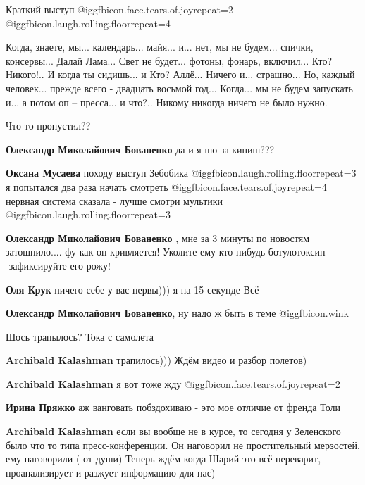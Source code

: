 \begin{itemize}
Краткий выступ @igg{fbicon.face.tears.of.joy}{repeat=2}  @igg{fbicon.laugh.rolling.floor}{repeat=4} 

Когда, знаете, мы... календарь... майя... и... нет, мы не будем... спички, консервы...
Далай Лама... Свет не будет... фотоны, фонарь, включил... Кто? Никого!.. И когда ты
сидишь... и Кто? Аллё... Ничего и... страшно... Но, каждый человек... прежде всего -
двадцать восьмой год... Когда... мы не будем запускать и... а потом оп – пресса... и
что?.. Никому никогда ничего не было нужно.


Что-то пропустил??

\begin{itemize} %
\textbf{Олександр Миколайович Бованенко} да и я шо за кипиш???

\textbf{Оксана Мусаева} походу выступ Зебобика  @igg{fbicon.laugh.rolling.floor}{repeat=3} я попытался два раза начать смотреть  @igg{fbicon.face.tears.of.joy}{repeat=4} нервная система сказала - лучше смотри мультики @igg{fbicon.laugh.rolling.floor}{repeat=3} 

\textbf{Олександр Миколайович Бованенко} , мне за 3 минуты по новостям затошнило.... фу как он кривляется! Уколите ему кто-нибудь ботулотоксин -зафиксируйте его рожу!

\textbf{Оля Крук} ничего себе у вас нервы))) я на 15 секунде Всё

\textbf{Олександр Миколайович Бованенко}, ну надо ж быть в теме  @igg{fbicon.wink} 
\end{itemize} %

Шось трапылось? Тока с самолета

\begin{itemize} %
\textbf{Archibald Kalashman} трапилось)))
Ждём видео и разбор полетов)

\textbf{Archibald Kalashman} я вот тоже жду  @igg{fbicon.face.tears.of.joy}{repeat=2} 

\textbf{Ирина Пряжко} аж ванговать побздохиваю - это мое отличие от френда Толи

\textbf{Archibald Kalashman} если вы вообще не в курсе, то сегодня у Зеленского было что то типа пресс-конференции. Он наговорил не простительный мерзостей, ему наговорили ( от души)
Теперь ждём когда Шарий это всё переварит, проанализирует и разжует информацию для нас)


\end{itemize}
\end{itemize}
